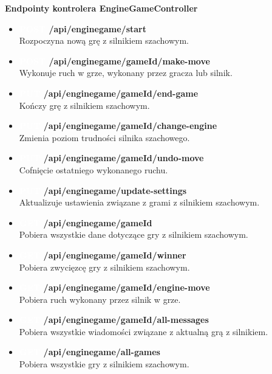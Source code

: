 \documentclass[12pt,a4paper]{article}
\begin{document}
\noindent  \textbf{Endpointy kontrolera EngineGameController}
\begin{itemize} 
    \item \textbf{\colorbox{green!90}{\textcolor{white}{POST}} /api/enginegame/start}\\
    Rozpoczyna nową grę z silnikiem szachowym. 
    \item \textbf{\colorbox{green!90}{\textcolor{white}{POST}} /api/enginegame/{gameId}/make-move}\\
    Wykonuje ruch w grze, wykonany przez gracza lub silnik.
    \item \textbf{\colorbox{orange!90}{\textcolor{white}{PUT}} /api/enginegame/{gameId}/end-game}\\
    Kończy grę z silnikiem szachowym. 
    \item \textbf{\colorbox{orange!90}{\textcolor{white}{PUT}} /api/enginegame/{gameId}/change-engine}\\
    Zmienia poziom trudności silnika szachowego. 
    \item \textbf{\colorbox{orange!90}{\textcolor{white}{PUT}} /api/enginegame/{gameId}/undo-move}\\
    Cofnięcie ostatniego wykonanego ruchu. 
    \item \textbf{\colorbox{orange!90}{\textcolor{white}{PUT}} /api/enginegame/update-settings}\\
    Aktualizuje ustawienia związane z grami z silnikiem szachowym. 
    \item \textbf{\colorbox{cyan!90}{\textcolor{white}{GET}} /api/enginegame/{gameId}}\\
    Pobiera wszystkie dane dotyczące gry z silnikiem szachowym.
    \item \textbf{\colorbox{cyan!90}{\textcolor{white}{GET}} /api/enginegame/{gameId}/winner}\\
    Pobiera zwycięzcę gry z silnikiem szachowym. 
    \item \textbf{\colorbox{cyan!90}{\textcolor{white}{GET}} /api/enginegame/{gameId}/engine-move}\\
    Pobiera ruch wykonany przez silnik w grze. 
    \item \textbf{\colorbox{cyan!90}{\textcolor{white}{GET}} /api/enginegame/{gameId}/all-messages}\\
    Pobiera wszystkie wiadomości związane z aktualną grą z silnikiem. 
    \item \textbf{\colorbox{cyan!90}{\textcolor{white}{GET}} /api/enginegame/all-games}\\
    Pobiera wszystkie gry z silnikiem szachowym. 
\end{itemize}
\end{document}
